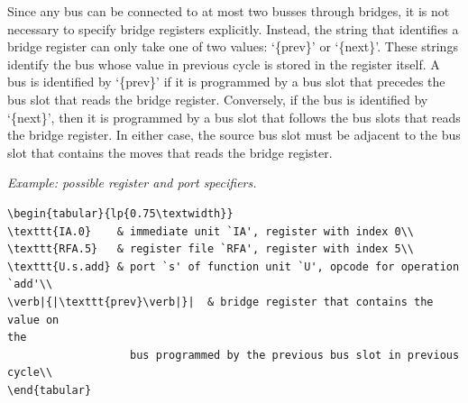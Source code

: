\documentclass[twoside]{tceusermanual}
\begin{document}
Since any bus can be connected to at most two busses through bridges, it is
not necessary to specify bridge registers explicitly.  Instead, the string
that identifies a bridge register can only take one of two values:
`\{prev\}' or `\{next\}'.  These strings identify the bus whose value in
previous cycle is stored in the register itself.  A bus is identified by
`\{prev\}' if it is programmed by a bus slot that precedes the bus slot that
reads the bridge register.  Conversely, if the bus is identified by
`\{next\}', then it is programmed by a bus slot that follows the bus slots
that reads the bridge register.  In either case, the source bus slot must be
adjacent to the bus slot that contains the moves that reads the bridge
register.

\emph{Example: possible register and port specifiers.}
\begin{verbatim}
\begin{tabular}{lp{0.75\textwidth}}
\texttt{IA.0}    & immediate unit `IA', register with index 0\\
\texttt{RFA.5}   & register file `RFA', register with index 5\\
\texttt{U.s.add} & port `s' of function unit `U', opcode for operation
`add'\\
\verb|{|\texttt{prev}\verb|}|  & bridge register that contains the value on
the
                   bus programmed by the previous bus slot in previous
cycle\\
\end{tabular}
\end{verbatim}
\end{document}
